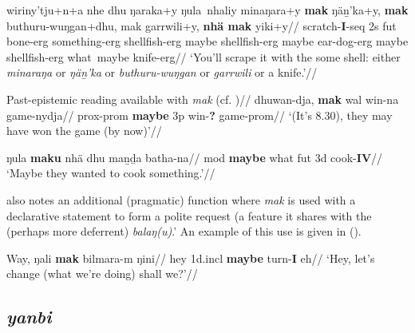 \a{}\begingl
\gla wiriny'tju+n+a nhe dhu ŋaraka+y ŋula~nhaliy minaŋara+y \textbf{mak} ŋäṉ'ka+y, \textbf{mak} buthuru-wuŋgan+dhu, mak garrwili+y, \textbf{nhä mak} yiki+y//
\glb scratch-\textbf{I}-\gls{seq} 2s \gls{fut} bone-\gls{erg} something-\gls{erg} shellfish-\gls{erg} maybe shellfish-\gls{erg} maybe ear-dog-\gls{erg} maybe shellfish-\gls{erg} what~maybe knife-\gls{erg}//
\glft`You'll scrape it with the some shell: either \textit{minaraŋa} or \textit{ŋäṉ'ka} or \textit{buthuru-wuŋgan} or \textit{garrwili} or a knife.'//
\endgl\xe




\pex\a{}\begingl\glpreamble Past-epistemic reading available with \textit{mak} (cf. )//
 dhuwan-dja, \textbf{mak} wal win-na game-nydja//
 \gls{prox}-\gls{prom} \textbf{maybe} 3p win-\textbf{?} game-\gls{prom}//
\glft`(It's 8.30), they may have won the game (by now)'\trailingcitation{[F~20180802]}//\endgl

\a{}\begingl\gla ŋula \textbf{maku} nhä dhu maṉḏa batha-na//
\glb \gls{mod} \textbf{maybe} what \gls{fut} 3d cook-\textbf{IV}//
\glft`Maybe they wanted to cook something.'//\endgl\xe




\citet[688-9]{Wilkinson1991} also notes an additional (pragmatic) function where \textit{mak} is used with a declarative statement to form a polite request (a feature it shares with the (perhaps more deferrent) \textit{balaŋ(u)}.' An example of this use is given in (\nextx).

\pex\begingl\gla Way, ŋali \textbf{mak} bilmara-m ŋini//
\glb hey 1d.\gls{incl} \textbf{maybe} turn-\textbf{I} eh//
\glft`Hey, let's change (what we're doing) shall we?'//\endgl\xe
\subsection*{\textit{yanbi}}

